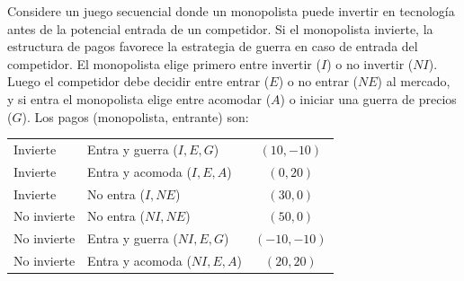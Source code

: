 \question Considere un juego secuencial donde un monopolista puede invertir en tecnología antes de la potencial entrada de un competidor. Si el monopolista invierte, la estructura de pagos favorece la estrategia de guerra en caso de entrada del competidor. El monopolista elige primero entre invertir ($I$) o no invertir ($NI$). Luego el competidor debe decidir entre entrar ($E$) o no entrar ($NE$) al mercado, y si entra el monopolista elige entre acomodar ($A$) o iniciar una guerra de precios ($G$). Los pagos (monopolista, entrante) son:
\begin{center}
\renewcommand{\arraystretch}{1.1}
\begin{tabular}{llc}
  Invierte & Entra y guerra ($I,E,G$) & $(10,-10)$ \\
  Invierte & Entra y acomoda ($I,E,A$) & $(0,20)$ \\
  Invierte & No entra ($I,NE$) & $(30,0)$ \\
  No invierte & No entra ($NI,NE$) & $(50,0)$ \\
  No invierte & Entra y guerra ($NI,E,G$) & $(-10,-10)$ \\
  No invierte & Entra y acomoda ($NI,E,A$) & $(20,20)$
\end{tabular}
\end{center}
